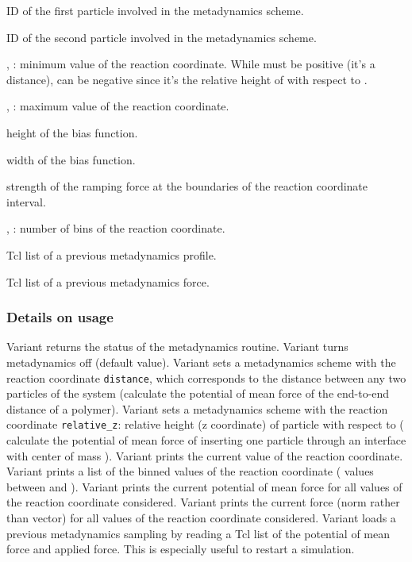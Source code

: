 \begin{arguments}
\item[\var{pid_1}] ID of the first particle involved in the
  metadynamics scheme.
\item[\var{pid_2}] ID of the second particle involved in the
  metadynamics scheme.
\item[\var{d_\mathrm{min}}, \var{z_\mathrm{min}}]: minimum value of
  the reaction coordinate. While  must be positive
  (it's a distance),  can be negative since it's
  the relative height of  with respect to .
\item[\var{d_\mathrm{max}}, \var{z_\mathrm{max}}]: maximum value of
  the reaction coordinate. 
\item[\var{b_\mathrm{height}}] height of the bias function.
\item[\var{b_\mathrm{width}}] width of the bias function.
\item[\var{f_\mathrm{bound}}] strength of the ramping force at the
  boundaries of the reaction coordinate interval.
\item[\var{d_\mathrm{bins}}, \var{z_\mathrm{bins}}]: number of bins of
  the reaction coordinate.
\item[\var{profile\_list}] Tcl list of a previous metadynamics
  profile.
\item[\var{force\_list}] Tcl list of a previous metadynamics force.
\end{arguments}

\subsubsection{Details on usage}

Variant  returns the status of the metadynamics
routine. Variant  turns metadynamics off (default
value). Variant  sets a metadynamics scheme with the
reaction coordinate \texttt{distance}, which corresponds to the
distance between any two particles of the system (\eg calculate the
potential of mean force of the end-to-end distance of a
polymer). Variant  sets a metadynamics scheme with the
reaction coordinate \texttt{relative_z}: relative height (\ie z
coordinate) of particle  with respect to  (\eg
calculate the potential of mean force of inserting one particle
 through an interface with center of mass
). Variant  prints the current value of the
reaction coordinate. Variant  prints a list of the binned
values of the reaction coordinate (\eg {} values
between  and ). Variant
 prints the current potential of mean force for all values
of the reaction coordinate considered. Variant  prints the
current force (norm rather than vector) for all values of the reaction
coordinate considered. Variant  loads a previous
metadynamics sampling by reading a Tcl list of the potential of mean
force and applied force. This is especially useful to restart a
simulation.

